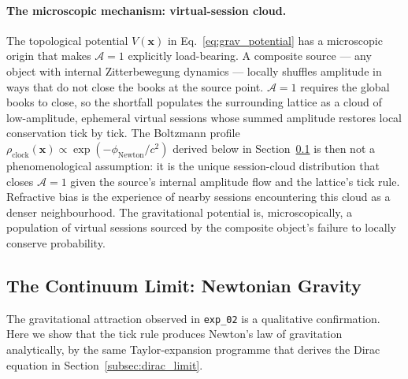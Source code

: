 \paragraph{The microscopic mechanism: virtual-session cloud.}
The topological potential $V(\mathbf{x})$ in
Eq.~\eqref{eq:grav_potential} has a microscopic origin that makes
$\mathcal{A}=1$ explicitly load-bearing.  A composite source ---
any object with internal Zitterbewegung dynamics --- locally
shuffles amplitude in ways that do not close the books at the
source point.  $\mathcal{A}=1$ requires the global books to close,
so the shortfall populates the surrounding lattice as a cloud of
low-amplitude, ephemeral virtual sessions whose summed amplitude
restores local conservation tick by tick.  The Boltzmann profile
$\rho_\text{clock}(\mathbf{x}) \propto
\exp(-\phi_\text{Newton}/c^2)$ derived below in
Section~\ref{subsec:newtonian_limit} is then not a phenomenological
assumption: it is the unique session-cloud distribution that closes
$\mathcal{A}=1$ given the source's internal amplitude flow and the
lattice's tick rule.  Refractive bias is the experience of nearby
sessions encountering this cloud as a denser neighbourhood.  The
gravitational potential is, microscopically, a population of
virtual sessions sourced by the composite object's failure to
locally conserve probability.

\subsection{The Continuum Limit: Newtonian Gravity}
\label{subsec:newtonian_limit}

The gravitational attraction observed in \texttt{exp\_02} is a
qualitative confirmation. Here we show that the tick rule produces
Newton's law of gravitation analytically, by the same Taylor-expansion
programme that derives the Dirac equation in
Section~\ref{subsec:dirac_limit}.

